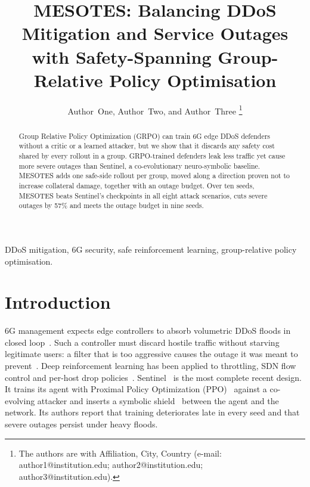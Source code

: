 \documentclass[journal]{IEEEtran}
\begin{document}
\title{MESOTES: Balancing DDoS Mitigation and Service Outages with Safety-Spanning Group-Relative Policy Optimisation}

\author{Author~One, Author~Two, and Author~Three%
\thanks{The authors are with Affiliation, City, Country (e-mail: author1@institution.edu; author2@institution.edu; author3@institution.edu).}}


\maketitle

\begin{abstract}
Group Relative Policy Optimization (GRPO) can train 6G edge DDoS defenders without a critic or a learned attacker, but we show that it discards any safety cost shared by every rollout in a group. GRPO-trained defenders leak less traffic yet cause more severe outages than Sentinel, a co-evolutionary neuro-symbolic baseline. MESOTES adds one safe-side rollout per group, moved along a direction proven not to increase collateral damage, together with an outage budget. Over ten seeds, MESOTES beats Sentinel's checkpoints in all eight attack scenarios, cuts severe outages by 57\% and meets the outage budget in nine seeds.
\end{abstract}

\begin{IEEEkeywords}
DDoS mitigation, 6G security, safe reinforcement learning, group-relative policy optimisation.
\end{IEEEkeywords}

\section{Introduction}
 6G management expects edge controllers to absorb volumetric DDoS floods in closed loop~\cite{benzaid2020zsm,liyanage2023oran}. Such a controller must discard hostile traffic without starving legitimate users: a filter that is too aggressive causes the outage it was meant to prevent~\cite{guo2020xai6g}. Deep reinforcement learning has been applied to throttling, SDN flow control and per-host drop policies~\cite{malialis2015distributed,liu2018drlddos,simpson2020perhost}. Sentinel~\cite{alfatemi2026sentinel} is the most complete recent design. It trains its agent with Proximal Policy Optimization (PPO)~\cite{schulman2017ppo} against a co-evolving attacker and inserts a symbolic shield~\cite{alshiekh2018shielding} between the agent and the network. Its authors report that training deteriorates late in every seed and that severe outages persist under heavy floods.
\end{document}
